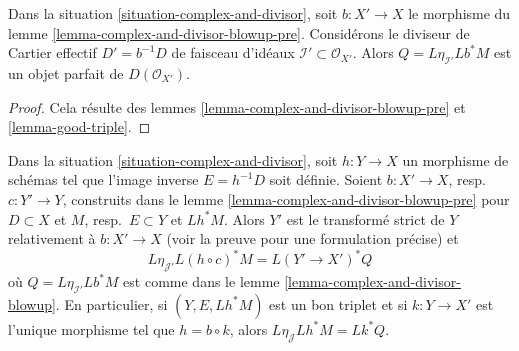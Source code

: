 \begin{lemma}
\label{lemma-complex-and-divisor-blowup}
Dans la situation \ref{situation-complex-and-divisor}, soit $b : X' \to X$
le morphisme du lemme \ref{lemma-complex-and-divisor-blowup-pre}.
Considérons le diviseur de Cartier effectif $D' = b^{-1}D$ de faisceau d'idéaux
$\mathcal{I}' \subset \mathcal{O}_{X'}$. Alors $Q = L\eta_{\mathcal{I}'}Lb^*M$
est un objet parfait de $D(\mathcal{O}_{X'})$.
\end{lemma}

\begin{proof}
Cela résulte des lemmes \ref{lemma-complex-and-divisor-blowup-pre}
et \ref{lemma-good-triple}.
\end{proof}

\begin{lemma}
\label{lemma-complex-and-divisor-blowup-base-change}
Dans la situation \ref{situation-complex-and-divisor}, soit $h : Y \to X$
un morphisme de schémas tel que l'image inverse $E = h^{-1}D$
soit définie. Soient $b : X' \to X$, resp.\ $c : Y' \to Y$, construits dans le
lemme \ref{lemma-complex-and-divisor-blowup-pre} pour
$D \subset X$ et $M$, resp.\ $E \subset Y$ et $Lh^*M$.
Alors $Y'$ est le transformé strict de $Y$ relativement à $b : X' \to X$
(voir la preuve pour une formulation précise) et
$$
L\eta_{\mathcal{J}'}L(h \circ c)^*M = L(Y' \to X')^*Q
$$
où $Q = L\eta_{\mathcal{I}'}Lb^*M$ est comme dans le
lemme \ref{lemma-complex-and-divisor-blowup}.
En particulier, si $(Y, E, Lh^*M)$ est un bon triplet et si
$k : Y \to X'$ est l'unique morphisme tel que
$h = b \circ k$, alors $L\eta_\mathcal{J}Lh^*M = Lk^*Q$.
\end{lemma}

